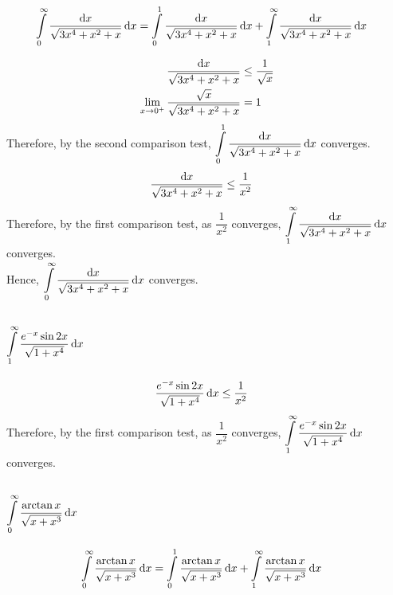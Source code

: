 \documentclass[fleqn, a4paper, draft]{amsart}
\begin{document}
\begin{align*}
	\int\limits_{0}^{\infty} \dfrac{\dif x}{\sqrt{3 x^4 + x^2 + x}} \dif x&= \int\limits_{0}^{1} \dfrac{\dif x}{\sqrt{3 x^4 + x^2 + x}} \dif x + \int\limits_{1}^{\infty} \dfrac{\dif x}{\sqrt{3 x^4 + x^2 + x}} \dif x
\end{align*}

\begin{align*}
	\dfrac{\dif x}{\sqrt{3 x^4 + x^2 + x}} &\leq \dfrac{1}{\sqrt{x}}\\
	\lim\limits_{x \to 0^+} \dfrac{\sqrt{x}}{\sqrt{3 x^4 + x^2 + x}} &= 1
\end{align*}
Therefore, by the second comparison test, $\displaystyle \int\limits_{0}^{1} \dfrac{\dif x}{\sqrt{3 x^4 + x^2 + x}} \dif x$ converges.\\

\begin{align*}
	\dfrac{\dif x}{\sqrt{3 x^4 + x^2 + x}} &\leq \dfrac{1}{x^2}
\end{align*}
Therefore, by the first comparison test, as $\dfrac{1}{x^2}$ converges, $\displaystyle \int\limits_{1}^{\infty} \dfrac{\dif x}{\sqrt{3 x^4 + x^2 + x}} \dif x$ converges.\\
Hence, $\displaystyle \int\limits_{0}^{\infty} \dfrac{\dif x}{\sqrt{3 x^4 + x^2 + x}} \dif x$ converges.

\subsection{$\displaystyle \int\limits_{1}^{\infty} \dfrac{e^{-x} \sin 2x}{\sqrt{1 + x^4}}\dif x$}

\begin{align*}
	\dfrac{e^{-x} \sin 2x}{\sqrt{1 + x^4}}\dif x &\leq \dfrac{1}{x^2}
\end{align*}
Therefore, by the first comparison test, as $\dfrac{1}{x^2}$ converges, $\displaystyle \int\limits_{1}^{\infty} \dfrac{e^{-x} \sin 2x}{\sqrt{1 + x^4}}\dif x$ converges.

\subsection{$\displaystyle \int\limits_{0}^{\infty} \dfrac{\arctan x}{\sqrt{x + x^3}} \dif x$}

\begin{align*}
	\int\limits_{0}^{\infty} \dfrac{\arctan x}{\sqrt{x + x^3}} \dif x&= \int\limits_{0}^{1} \dfrac{\arctan x}{\sqrt{x + x^3}} \dif x + \int\limits_{1}^{\infty} \dfrac{\arctan x}{\sqrt{x + x^3}} \dif x
\end{align*}
\end{document}

